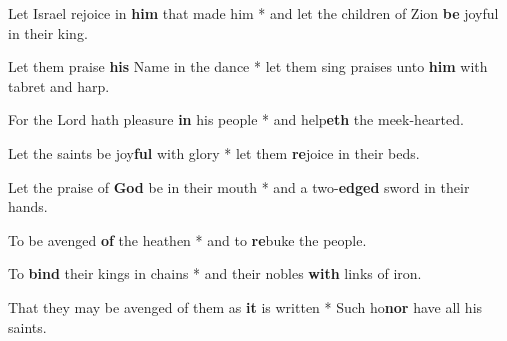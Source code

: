 \begin{multicols}{2}
	Let Israel rejoice in \textbf{him} that made him * and let the children of Zion \textbf{be} joyful in their king.
	
	Let them praise \textbf{his} Name in the dance * let them sing praises unto \textbf{him} with tabret and harp.
	
	For the Lord hath pleasure \textbf{in} his people * and help\textbf{eth} the meek-hearted.
	
	Let the saints be joy\textbf{ful} with glory * let them \textbf{re}joice in their beds.
	
	Let the praise of \textbf{God} be in their mouth * and a two-\textbf{edged} sword in their hands.
	
	To be avenged \textbf{of} the heathen * and to \textbf{re}buke the people.
	
	To \textbf{bind} their kings in chains * and their nobles \textbf{with} links of iron.
	
	That they may be avenged of them as \textbf{it} is written * Such ho\textbf{nor} have all his saints.
\end{multicols}